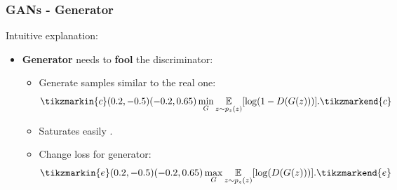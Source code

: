 \documentclass{beamer}
\begin{document}
\begin{frame}
	\frametitle{GANs - Generator}
	Intuitive explanation:
	\begin{itemize}
		\item \textbf{Generator} needs to \textbf{fool} the discriminator:
		\begin{itemize}
			\item Generate samples similar to the real one:
			\begin{equation}
				\tikzmarkin{c}(0.2,-0.5)(-0.2,0.65)
				\min_G  \underset{z \sim p_z(z)}{\mathbb{E}}[\log(1 - D(G(z)))].
				\tikzmarkend{c}
			\end{equation}
				\item Saturates easily \cite{goodfellowGenerativeAdversarialNetworks2014}.
				\item Change loss for generator:
					\begin{equation}
					\tikzmarkin{e}(0.2,-0.5)(-0.2,0.65)
					\max_G  \underset{z \sim p_z(z)}{\mathbb{E}}[\log( D(G(z)))].
					\tikzmarkend{e}
				\end{equation}
		\end{itemize}
	\end{itemize}
\end{frame}
\end{document}
